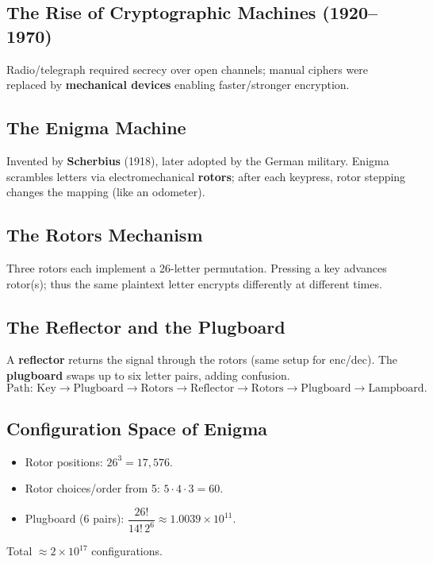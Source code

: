 \subsection{The Rise of Cryptographic Machines (1920–1970)}

Radio/telegraph required secrecy over open channels; manual ciphers were replaced by \textbf{mechanical devices} enabling faster/stronger encryption.

\subsection{The Enigma Machine}

Invented by \textbf{Scherbius} (1918), later adopted by the German military. Enigma scrambles letters via electromechanical \textbf{rotors}; after each keypress, rotor stepping changes the mapping (like an odometer).

\subsection{The Rotors Mechanism}

Three rotors each implement a 26-letter permutation. Pressing a key advances rotor(s); thus the same plaintext letter encrypts differently at different times.

\subsection{The Reflector and the Plugboard}

A \textbf{reflector} returns the signal through the rotors (same setup for enc/dec). The \textbf{plugboard} swaps up to six letter pairs, adding confusion.
\[
\text{Path: Key} \to \text{Plugboard} \to \text{Rotors} \to \text{Reflector} \to \text{Rotors} \to \text{Plugboard} \to \text{Lampboard}.
\]

\subsection{Configuration Space of Enigma}

\begin{itemize}
  \item Rotor positions: \(26^3 = 17{,}576\).
  \item Rotor choices/order from 5: \(5 \cdot 4 \cdot 3 = 60\).
  \item Plugboard (6 pairs): \(\dfrac{26!}{14!\,2^6} \approx 1.0039\times 10^{11}\).
\end{itemize}
Total \(\approx 2\times 10^{17}\) configurations.

